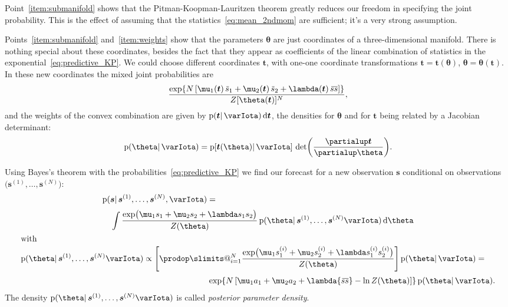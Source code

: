 \documentclass[\ifafour a4paper,12pt,\else a5paper,10pt,\fi%
onecolumn,oneside,article,%
british%
]{memoir}
\makeatletter
\theoremstyle{remark}
\theoremstyle{innote}
\def\prod{\DOTSI\prodop\slimits@}
\newcommand*{\de}{\partialup}%
\newcommand*{\di}{\mathrm{d}}%
\newcommand*{\pf}{\mathrm{p}}%
\renewcommand*{\|}{\mathpunct{|}}
\newcommand*{\widebar}[1]{{\mkern1.5mu\skew{2}\overline{\mkern-1.5mu#1\mkern-1.5mu}\mkern 1.5mu}}
\newcommand*{\yI}{\varIota}
\newcommand*{\ys}{\bm{s}}
\newcommand*{\yso}[1]{\ys^{(#1)}}
\newcommand*{\ysso}[1]{s^{(#1)}}
\newcommand*{\la}{\lambda}
\newcommand*{\yth}{\bm{\theta}}
\newcommand*{\yt}{\bm{t}}
\newcommand*{\yavv}{\widebar{s}}
\newcommand*{\ycv}{\widebar{ss}}
\makeatother
\begin{document}
Point~\ref{item:submanifold} shows that the Pitman-Koopman-Lauritzen
theorem greatly reduces our freedom in specifying the joint probability.
This is the effect of assuming that the statistics~\eqref{eq:mean_2ndmom}
are sufficient; it's a very strong assumption.

Points~\ref{item:submanifold} and~\ref{item:weights} show that the
parameters $\yth$ are just coordinates of a three-dimensional manifold.
There is nothing special about these coordinates, besides the fact that
they appear as coefficients of the linear combination of statistics in the
exponential~\eqref{eq:predictive_KP}. We could choose different coordinates
$\yt$, with one-one coordinate transformations $\yt=\yt(\yth)$,
$\yth=\yth(\yt)$. In these new coordinates the mixed joint probabilities
are
\begin{equation}
  \label{eq:extreme_probs_newcoords}
  \frac{\exp\{N \, [
    \mu_1(\yt)\, \yavv_1 + \mu_2(\yt)\, \yavv_2 + \la(\yt)\, \ycv]\}
  }{Z[\yth(\yt)]^N},
\end{equation}
and the weights of the convex combination are given by
$\pf(\yt \|\yI) \, \di\yt$, the densities for $\yth$ and for $\yt$ being
related by a Jacobian determinant:
\begin{equation}
  \label{eq:jacobian}
  \pf(\yth \|\yI) = \pf[\yt(\yth) \| \yI]\,
  \det\biggl( \frac{\de\yt}{\de\yth}\biggr).
\end{equation}


\bigskip

Using Bayes's theorem with the probabilities~\eqref{eq:predictive_KP} we
find our forecast for a new observation $\ys$ conditional on observations
$\bigl( \yso{1}, \dotsc,\yso{N} \bigr)$:
\begin{subequations}    \label{eq:conditional_prediction}
  \begin{gather}
    \begin{multlined}[][0.9\linewidth]
      \pf(\ys \| \yso{1}, \dotsc, \yso{N}, \yI ) ={}\\[\jot]
      \int
      \frac{  \exp\bigl(
        \mu_1 s_1 + \mu_2 s_2 + \la s_1 s_2
        \bigr) }{Z(\yth)}
      \,
      \pf(\yth \| \yso{1},\dotsc,\yso{N} \yI) \, \di\yth
    \end{multlined}
    \\
    \shortintertext{with}
    \begin{multlined}[0.95\linewidth]
    \pf(\yth \| \yso{1},\dotsc,\yso{N} \yI)
    \propto
    \Biggl[  \prod_{i=1}^{N}
    \frac{  \exp\bigl(
      \mu_1 \ysso{i}_1 + \mu_2 \ysso{i}_2 + \la \ysso{i}_1 \ysso{i}_2
      \bigr) }{Z(\yth)}
    \Biggr]\,
    \pf(\yth \| \yI) 
={}\\[\jot]
     \exp\{N\,[
      \mu_1 a_1 + \mu_2 a_2 + \la \ycv -\ln Z(\yth)]\}\,
    \pf(\yth \| \yI).
    \end{multlined}
  \end{gather}
\end{subequations}
The density $\pf(\yth \| \yso{1},\dotsc,\yso{N} \yI)$ is called
\emph{posterior parameter density}.
\end{document}

